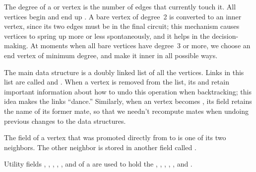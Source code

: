 The degree  of a  or  vertex is the
number of edges that
currently touch it. All vertices begin  and end up .
A bare
vertex of degree~2 is converted to an inner vertex, since its two edges
must be in the final circuit; this mechanism causes  vertices to
spring up more or less spontaneously, and it helps in the decision-making.
At moments when all bare vertices have degree~3 or more, we choose an
end vertex of minimum degree, and make it inner in all possible ways.

The main data structure is a doubly linked list of all the 
vertices.
Links in this list are called  and . When a vertex
is
removed from the list, its  and  retain important
information
about how to undo this operation when backtracking; this idea makes
the links ``dance.'' Similarly, when an  vertex becomes ,
its  field retains the name of its former mate, so that we needn't
recompute mates when undoing previous changes to the data structures.

The  field of a vertex that was promoted directly from  to
 is one of its two neighbors. The other neighbor is stored
in another field called .

Utility fields , , , , , and 
of a 
are used to hold the , , , , , and .

